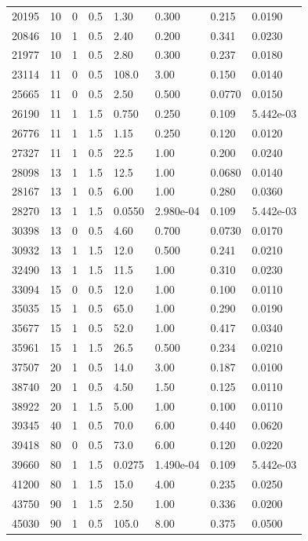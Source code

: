 \documentclass[preview]{standalone}
\begin{document}
{{\begin{tabular}{L{1.2cm}C{1.2cm} C{0.3cm}C{0.5cm} C{1.4cm}C{1.4cm} C{1.4cm}C{1.4cm}}
  20195  &    10  & 0     & 0.5 &  1.30  & 0.300  & 0.215 &  0.0190   \\ 
  20846  &    10  & 1     & 0.5 &  2.40  & 0.200  & 0.341 &  0.0230   \\ 
  21977  &    10  & 1     & 0.5 &  2.80  & 0.300  & 0.237 &  0.0180   \\ 
  23114  &    11  & 0     & 0.5 &  108.0  & 3.00  & 0.150 &  0.0140   \\ 
  25665  &    11  & 0     & 0.5 &  2.50  & 0.500  & 0.0770 &  0.0150   \\ 
  26190  &    11  & 1     & 1.5 &  0.750  & 0.250  & 0.109 &  5.442e-03   \\ 
  26776  &    11  & 1     & 1.5 &  1.15  & 0.250  & 0.120 &  0.0120   \\ 
  27327  &    11  & 1     & 0.5 &  22.5  & 1.00  & 0.200 &  0.0240   \\ 
  28098  &    13  & 1     & 1.5 &  12.5  & 1.00  & 0.0680 &  0.0140   \\ 
  28167  &    13  & 1     & 0.5 &  6.00  & 1.00  & 0.280 &  0.0360   \\ 
  28270  &    13  & 1     & 1.5 &  0.0550  & 2.980e-04  & 0.109 &  5.442e-03   \\ 
  30398  &    13  & 0     & 0.5 &  4.60  & 0.700  & 0.0730 &  0.0170   \\ 
  30932  &    13  & 1     & 1.5 &  12.0  & 0.500  & 0.241 &  0.0210   \\ 
  32490  &    13  & 1     & 1.5 &  11.5  & 1.00  & 0.310 &  0.0230   \\ 
  33094  &    15  & 0     & 0.5 &  12.0  & 1.00  & 0.100 &  0.0110   \\ 
  35035  &    15  & 1     & 0.5 &  65.0  & 1.00  & 0.290 &  0.0190   \\ 
  35677  &    15  & 1     & 0.5 &  52.0  & 1.00  & 0.417 &  0.0340   \\ 
  35961  &    15  & 1     & 1.5 &  26.5  & 0.500  & 0.234 &  0.0210   \\ 
  37507  &    20  & 1     & 0.5 &  14.0  & 3.00  & 0.187 &  0.0100   \\ 
  38740  &    20  & 1     & 0.5 &  4.50  & 1.50  & 0.125 &  0.0110   \\ 
  38922  &    20  & 1     & 1.5 &  5.00  & 1.00  & 0.100 &  0.0110   \\ 
  39345  &    40  & 1     & 0.5 &  70.0  & 6.00  & 0.440 &  0.0620   \\ 
  39418  &    80  & 0     & 0.5 &  73.0  & 6.00  & 0.120 &  0.0220   \\ 
  39660  &    80  & 1     & 1.5 &  0.0275  & 1.490e-04  & 0.109 &  5.442e-03   \\ 
  41200  &    80  & 1     & 1.5 &  15.0  & 4.00  & 0.235 &  0.0250   \\ 
  43750  &    90  & 1     & 1.5 &  2.50  & 1.00  & 0.336 &  0.0200   \\ 
  45030  &    90  & 1     & 0.5 &  105.0  & 8.00  & 0.375 &  0.0500   \\ 
\hline 
\end{tabular} 

}}
\end{document}
